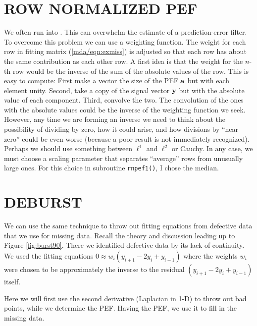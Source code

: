 \section{ROW NORMALIZED PEF}
We often run into .
This can overwhelm the estimate of a prediction-error filter.
To overcome this problem we can use a weighting function.
The weight for each row in fitting matrix
(\ref{mda/eqn:exmiss})
is adjusted so that each row has about the same
contribution as each other row.
A first idea is that the weight for the $n$-th row
would be the inverse of the sum of the absolute values of the row.
This is easy to compute:
First make a vector the size of the PEF $\bold a$ but with each element unity.
Second, take a copy of the signal vector $\bold y$
but with the absolute value of each component.
Third, convolve the two.
%
\noindent
The convolution of the ones with the absolute values
could be the inverse of the weighting function we seek.
However, any time we are forming an inverse we need to think
about the possibility of dividing by zero, how it could arise,
and how divisions by ``near zero'' could be even worse
(because a poor result is not immediately recognized).
Perhaps we should use something between $\ell^1$ and $\ell^2$ or Cauchy.
In any case, we must choose a scaling parameter
that separates ``average'' rows from unusually large ones.
For this choice in subroutine \texttt{rnpef1()}, I chose the median.


\section{DEBURST}
\par
We can use the same technique to throw out fitting equations
from defective data that we use for missing data.
Recall the theory and discussion leading up to 
Figure \ref{fig:burst90}.
There we identified defective data by its lack
of continuity.  We used the fitting equations
$0\approx w_i (y_{i+1} -2y_i + y_{i-1})$
where the weights $w_i$ were chosen
to be approximately the inverse
to the residual $(y_{i+1} -2y_i + y_{i-1})$ itself.
\par
Here we will first use the second derivative
(Laplacian in 1-D) to throw out bad points,
while we determine the PEF.
Having the PEF, we use it to fill in the missing data.

